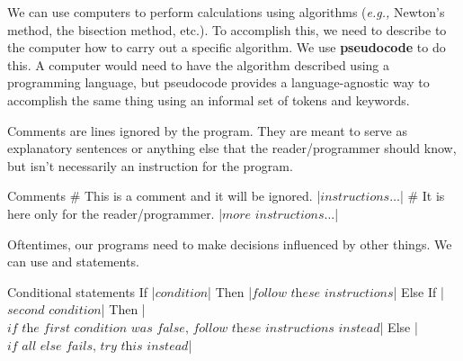 \documentclass[12pt,a4paper,titlepage]{article}
\begin{document}
            \begin{SummaryBox}[title=What is pseudocode]
                We can use computers to perform calculations using algorithms (\textit{e.g.,} Newton's method, the bisection method, etc.). To accomplish this, we need to describe to the computer how to carry out a specific algorithm. We use \textbf{pseudocode} to do this. A computer would need to have the algorithm described using a programming language, but pseudocode provides a language-agnostic way to accomplish the same thing using an informal set of tokens and keywords.
            \end{SummaryBox}

            \begin{SummaryBox}[title=Concepts of pseudocode, breakable]
                \begin{SummaryExtensionBox}[title=Comments]
                    Comments are lines ignored by the program. They are meant to serve as explanatory sentences or anything else that the reader/programmer should know, but isn't necessarily an instruction for the program.
                    \begin{codebox}{Comments}
                        # This is a comment and it will be ignored.
                        |\( \textit{instructions}\dots \)|
                        # It is here only for the reader/programmer.
                        |\( \textit{more instructions}\dots \)|
                    \end{codebox}
                \end{SummaryExtensionBox}
                
                \begin{SummaryExtensionBox}[title=Conditional statements]
                    Oftentimes, our programs need to make decisions influenced by other things. We can use  and  statements.
                    \begin{codebox}{Conditional statements}
                        If |\( \textit{condition} \)| Then
                            |\( \textit{follow these instructions} \)|
                        Else If |\( \textit{second condition} \)| Then
                            |\( \textit{if the first condition was false, follow these instructions instead} \)|
                        Else
                            |\( \textit{if all else fails, try this instead} \)|
                    \end{codebox}
                \end{SummaryExtensionBox}
                

\end{SummaryBox}
\end{document}
